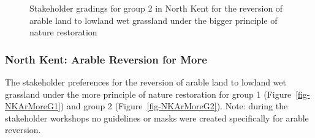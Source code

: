 \documentclass[
  12pt,
  letterpaper,
  DIV=11,
  numbers=noendperiod]{scrartcl}
\begin{document}
\begin{figure}[H]


\caption{\label{fig-NKArBigG2}Stakeholder gradings for group 2 in North
Kent for the reversion of arable land to lowland wet grassland under the
bigger principle of nature restoration}

\end{figure}%

\newpage{}

\subsubsection{North Kent: Arable Reversion for
More}\label{north-kent-arable-reversion-for-more}

The stakeholder preferences for the reversion of arable land to lowland
wet grassland under the more principle of nature restoration for group 1
(Figure~\ref{fig-NKArMoreG1}) and group 2 (Figure~\ref{fig-NKArMoreG2}).
Note: during the stakeholder workshops no guidelines or masks were
created specifically for arable reversion.
\end{document}
